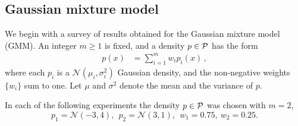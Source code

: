 %

\subsection{Gaussian mixture model}
\label{Results}

We begin with a survey of results obtained for the Gaussian mixture model (GMM).  An integer $m\ge 1$ is fixed, and a density $p\in {\cal P}$ has the form
\begin{equation*}
\begin{aligned}
p(x)& = \sum_{i=1}^{m} w_{i} p_{i}(x) \,,
\end{aligned}
\end{equation*}
where each $p_{i}$ is a $\mathcal{N}(\mu_i,\sigma_i^2)$ Gaussian density, and the non-negative weights $\{w_i\}$ sum to one. Let $\mu$ and $\sigma^{2}$ denote the mean and the variance of $p$.
%
%
%

In each of the following experiments the density $p\in{\cal P}$ was chosen with $m=2$,
\[
p_1 = \mathcal{N}(-3, 4),\ \
p_2 = \mathcal{N}(3, 1),\ \
w_1 =0.75,\
w_2 =0.25.
\]

